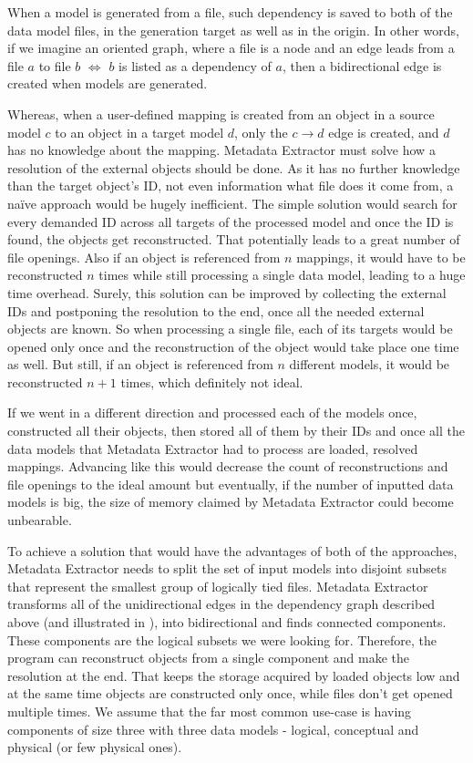 When a model is generated from a file, such dependency is saved to both of the data model files, in the generation target as well as in the origin. 
In other words, if we imagine an oriented graph, where a file is a node and an edge leads from a file $a$ to file $b$ $\iff$ $b$ is listed as a dependency of $a$, then a bidirectional edge is created when models are generated.

Whereas, when a user-defined mapping is created from an object in a source model $c$ to an object in a target model $d$, only the $c \rightarrow d$ edge is created, and $d$ has no knowledge about the mapping.
Metadata Extractor must solve how a resolution of the external objects should be done. 
As it has no further knowledge than the target object's ID, not even information what file does it come from, a naïve approach would be hugely inefficient. 
The simple solution would search for every demanded ID across all targets of the processed model and once the ID is found, the objects get reconstructed. 
That potentially leads to a great number of file openings. Also if an object is referenced from $n$ mappings, it would have to be reconstructed $n$ times while still processing a single data model, leading to a huge time overhead.
Surely, this solution can be improved by collecting the external IDs and postponing the resolution to the end, once all the needed external objects are known. 
So when processing a single file, each of its targets would be opened only once and the reconstruction of the object would take place one time as well. But still, if an object is referenced from $n$ different models, it would be reconstructed $n + 1$ times, which definitely not ideal.

If we went in a different direction and processed each of the models once, constructed all their objects, then stored all of them by their IDs and once all the data models that Metadata Extractor had to process are loaded, resolved mappings. 
Advancing like this would decrease the count of reconstructions and file openings to the ideal amount but eventually, if the number of inputted data models is big, the size of memory claimed by Metadata Extractor could become unbearable.

To achieve a solution that would have the advantages of both of the approaches, Metadata Extractor needs to split the set of input models into disjoint subsets that represent the smallest group of logically tied files. 
Metadata Extractor transforms all of the unidirectional edges in the dependency graph described above (and illustrated in ), into bidirectional and finds connected components. These components are the logical subsets we were looking for. 
Therefore, the program can reconstruct objects from a single component and make the resolution at the end. That keeps the storage acquired by loaded objects low and at the same time objects are constructed only once, while files don't get opened multiple times. 
We assume that the far most common use-case is having components of size three with three data models - logical, conceptual and physical (or few physical ones). \\

